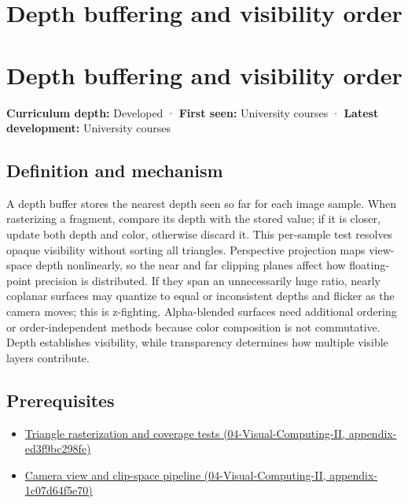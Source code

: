 \hypertarget{appendix-97578ed97952}{}
\section*{Depth buffering and visibility order}
\section{Depth buffering and visibility order}\label{appendix-97578ed97952-depth-buffering-and-visibility-order}

\textbf{Curriculum depth:} Developed · \textbf{First seen:} University courses · \textbf{Latest development:} University courses

\subsection{Definition and mechanism}\label{appendix-97578ed97952-definition-and-mechanism}

A depth buffer stores the nearest depth seen so far for each image sample. When rasterizing a fragment, compare its depth with the stored value; if it is closer, update both depth and color, otherwise discard it. This per-sample test resolves opaque visibility without sorting all triangles. Perspective projection maps view-space depth nonlinearly, so the near and far clipping planes affect how floating-point precision is distributed. If they span an unnecessarily huge ratio, nearly coplanar surfaces may quantize to equal or inconsistent depths and flicker as the camera moves; this is z-fighting. Alpha-blended surfaces need additional ordering or order-independent methods because color composition is not commutative. Depth establishes visibility, while transparency determines how multiple visible layers contribute.

\subsection{Prerequisites}\label{appendix-97578ed97952-prerequisites}

\begin{itemize}
\tightlist
\item
  \href{../04-Visual-Computing-II/main.pdf\#nameddest=appendix-ed3f9bc298fe}{Triangle rasterization and coverage tests (04-Visual-Computing-II, appendix-ed3f9bc298fe)}
\item
  \href{../04-Visual-Computing-II/main.pdf\#nameddest=appendix-1c07d64f5e70}{Camera view and clip-space pipeline (04-Visual-Computing-II, appendix-1c07d64f5e70)}
\end{itemize}

